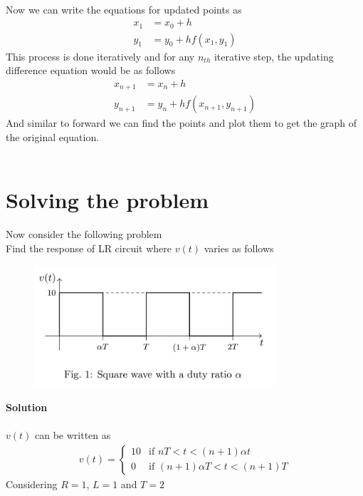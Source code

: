 \documentclass{article}
\begin{document}
\\
Now we can write the equations for updated points as 
\begin{align*}
    x_1 &= x_0 + h \\ 
    y_1 &= y_0 + hf(x_1,y_1)
\end{align*}
This process is done iteratively and for any $n_{th}$ iterative step, the updating difference equation would be as follows  
\begin{align*}
    x_{n+1} &= x_n + h \\ 
    y_{n+1} &= y_n + hf(x_{n+1},y_{n+1})
\end{align*}
And similar to forward we can find the points and plot them to get the graph of the original equation.\\
\\
\section*{Solving the problem}
Now consider the following problem\\
Find the response of LR circuit where $v(t)$ varies as follows
\begin{figure}[h!] %
  \centering
  \includegraphics[width=0.8\textwidth]{fig3.png}
\end{figure}
\newpage
\textbf{Solution}\\
\\
$v(t)$ can be written as
\begin{align*}
    v(t) =
\begin{cases}
10 & \text{if } nT < t < (n+1)\alpha t \\
0 & \text{if } (n+1)\alpha T < t < (n+1)T 
\end{cases}
\end{align*}
Considering $R=1$, $L=1$ and $T=2$
\end{document}
